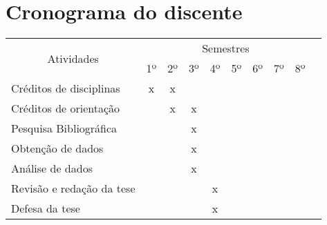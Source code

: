 \documentclass[12pt,a4paper,oneside]{book}
\begin{document}
\chapter{Cronograma do discente}
\begin{center}
    \begin{tabular}{|l|c|c|c|c|c|c|c|c|c|}
        \hline
        \multicolumn{1}{|c|}{\multirow{2}{*}{Atividades}} & \multicolumn{8}{c|}{Semestres} \\ \cline{2-9}
         & 1$º$ & 2$º$ & 3$º$ & 4$º$ & 5$º$ & 6$º$ & 7$º$ & 8$º$ \\ \hline
        Cr\'{e}ditos de disciplinas & x & x & & & & & & \\ \hline
        Cr\'{e}ditos de orienta\c{c}\~ao & & x & x & & & & & \\ \hline
        Pesquisa Bibliogr\'{a}fica & & & x & & & & & \\ \hline
        Obten\c{c}\~ao de dados & & & x & &  & & & \\ \hline
        An\'{a}lise de dados & & & x & & & & & \\ \hline
        Revis\~{a}o e reda\c{c}\~ao da tese & & & & x & & & & \\ \hline
        Defesa da tese & & & & x & & & & \\ \hline
    \end{tabular}
\end{center}
\pagebreak

\medskip
\printbibliography[heading=bibintoc,title={Refer\^{e}ncias},type=article]

\backmatter
\end{document}

